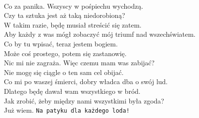 \\

\charszam{}
Co za panika. Wszyscy w pośpiechu wychodzą.\\
Czy ta sztuka jest aż taką niedorobioną?\\
W takim razie, będę musiał streścić się zatem.\\
Aby każdy z was mógł zobaczyć mój triumf nad wszechświatem.\\
Co by tu wpisać, teraz jestem bogiem.\\
Może coś prostego, potem się zastanowię.\\
Nic mi nie zagraża. Więc czemu mam was zabijać?\\
Nie mogę się ciągle o ten sam cel obijać.\\
Co mi po waszej śmierci, dobry władca dba o swój lud.\\
Dlatego będę dawał wam wszystkiego w bród.\\
Jak zrobić, żeby między nami wszystkimi była zgoda?\\
Już wiem. \texttt{Na patyku dla każdego loda!}\\











